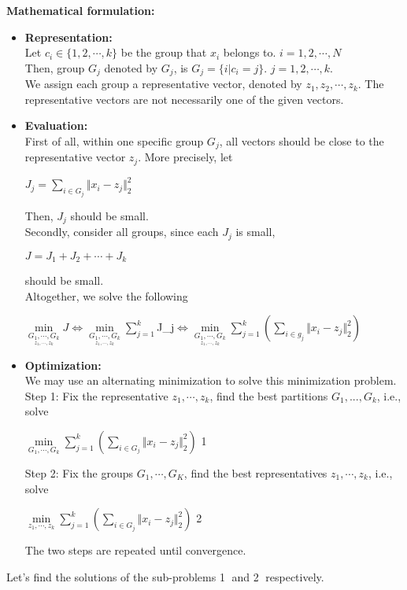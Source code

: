 \documentclass{article}
\begin{document}
\textbf{Mathematical formulation:}
\begin{itemize}

\item \textbf{Representation:} \\
Let $c_i \in \{1,2,\cdots,k\}$ be the group that $x_i$ belongs to. $i = 1,2, \cdots, N$ \\
Then, group $G_j$ denoted by $G_j$, is $G_j = \{i|c_i = j\}$. $j = 1,2, \cdots,k$. \\
We assign each group a representative vector, denoted by $z_1, z_2, \cdots, z_k$. The representative vectors are not necessarily one of the given vectors.

\item \textbf{Evaluation:} \\
First of all, within one specific group $G_j$, all vectors should be close to the representative vector $z_j$. More precisely, let 
\begin{center}
    $J_j = \sum_{i \in G_j} \Vert x_i - z_j \Vert_{2}^{2}$
\end{center}
Then, $J_j$ should be small. \\
Secondly, consider all groups, since each $J_j$ is small,
\begin{center}
    $J = J_1 + J_2 + \cdots + J_k$
\end{center}
should be small. \\
\pagebreak
Altogether, we solve the following
\begin{center}
    $\underset{\underset{z_1, \cdots, z_k}{G_1, \cdots, G_k}}{\min} J \iff 
    \underset{\underset{z_1, \cdots, z_k}{G_1, \cdots, G_k}}{\min} \sum_{j=1}^{k} $J_j$ \iff \underset{\underset{z_1, \cdots, z_k}{G_1, \cdots, G_k}}{\min} \sum_{j=1}^{k} (\sum_{i \in g_j} \Vert x_i - z_j \Vert_{2}^{2})$ 
\end{center}
\item \textbf{Optimization:}  \\
We may use an alternating minimization to solve this minimization problem. 
\bigbreak
Step 1: Fix the representative $z_1, \cdots, z_k$, find the best partitions $G_1, ..., G_k$, i.e., solve 
\begin{center}
    $\underset{G_1,\cdots,G_k}{\min} \sum_{j=1}^{k} (\sum_{i \in G_j} \Vert x_i - z_j \Vert_{2}^{2})$ \textcircled{1}
\end{center}
Step 2: Fix the groups $G_1, \cdots, G_K$, find the best representatives $z_1, \cdots, z_k$, i.e., solve
\begin{center}
    $\underset{z_1, \cdots, z_k}{\min} \sum_{j=1}^{k} (\sum_{i \in G_j} \Vert x_i - z_j \Vert_{2}^{2})$ \textcircled{2}
\end{center}
The two steps are repeated until convergence.

\end{itemize}
Let's find the solutions of the sub-problems \textcircled{1} and \textcircled{2} respectively. 
\end{document}
